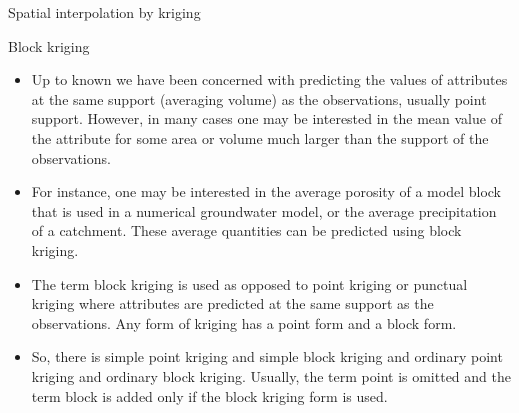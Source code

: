 \documentclass[8pt]{beamer}
\renewcommand{\emph}[1]{\textcolor{myorange}{#1}}
\begin{document}
 \begin{frame}{Spatial interpolation by kriging}
     \begin{block}{Block kriging}
    \end{block}
    \begin{itemize}
        \item Up to known we have been concerned with predicting the values of attributes at the same  support (averaging volume) as the observations, usually point support. However, in many cases one may be interested in the mean value of the attribute for some area or volume much larger than the support of the observations.
        \item For instance, one may be interested in the \emph{average porosity} of a model block that is used in a \emph{numerical groundwater model}, or the \emph{average precipitation} of a catchment. These average quantities can be predicted using \alert{block kriging}.
        \item The term \emph{block kriging} is used as opposed to \emph{point kriging} or \emph{punctual kriging} where attributes are predicted at the same support as the observations. Any form of \emph{kriging} has a \emph{point} form and a \emph{block} form.
        \item So, there is \emph{simple point kriging} and \emph{simple block kriging} and \emph{ordinary point kriging} and \emph{ordinary block kriging}. Usually, the term \emph{point} is omitted and the term \emph{block} is added only if the \emph{block kriging} form is used.
    \end{itemize}
   \end{frame}
\end{document}
